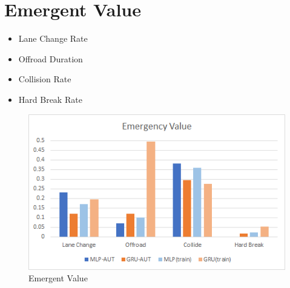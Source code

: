 \section{Emergent Value}

\begin{itemize}
\item Lane Change Rate
\item Offroad Duration
\item Collision Rate
\item Hard Break Rate
\end{itemize}

\begin{figure}[H]
\begin{center}
\includegraphics[width=14cm]{./figures/graph_emergency.png}
\caption{Emergent Value}
\label{fig:graph_emergency}
\end{center}
\end{figure}




